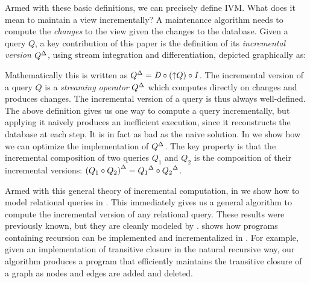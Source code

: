 Armed with these basic definitions, we can precisely define IVM.  What
does it mean to maintain a view incrementally?  A maintenance
algorithm needs to compute the \emph{changes} to the view given the
changes to the database. Given a query $Q$, a key contribution of this
paper is the definition of its \emph{incremental version} ${Q}^{\Delta}$,
using stream integration and differentiation, depicted graphically as:
%
\begin{center}
\end{center}
%
Mathematically this is written as ${Q}^{\Delta} = \mathit{D} \circ ({\uparrow}Q) \circ
\mathit{I}$.  The incremental version of a query $Q$ is a \emph{streaming
operator} ${Q}^{\Delta}$ which computes directly on changes and produces
changes.  The incremental version of a query is thus always
well-defined.  The above definition gives us one way to compute a
query incrementally, but applying it naively produces an inefficient
execution, since it reconstructs the database at each step.  It is in
fact as bad as the naive solution.  In  we
show how we can optimize the implementation of ${Q}^{\Delta}$. The key
property is that the incremental composition of two queries $Q_1$ and
$Q_2$ is the composition of their incremental versions: ${(Q_1
  \circ Q_2)}^{\Delta} = {Q_1}^{\Delta} \circ {Q_2}^{\Delta}$.

Armed with this general theory of incremental computation, in
 we show how to model relational queries in
\dbsp.  This immediately gives us a general algorithm to compute the
incremental version of any relational query.  These results were
previously known, but they are cleanly modeled by \dbsp.
 shows how programs containing recursion can be
implemented and incrementalized in \dbsp.  For example, given an
implementation of transitive closure in the natural recursive way, our
algorithm produces a program that efficiently maintains the transitive
closure of a graph as nodes and edges are added and deleted.

